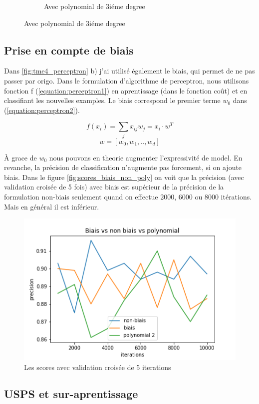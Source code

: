 \documentclass[a4paper,12pt]{article}
\begin{document}
\begin{figure}[h!]
\begin{subfigure}{.33\textwidth}
	\caption{Avec polynomial de 3iéme degree}
\end{subfigure}
\end{figure}

\subsection{Prise en compte de biais}

Dans \autoref{fig:tme4_perceptron} b) j'ai utilisé également le biais, qui permet de ne pas passer par origo. Dans le formulation
d'algorithme de perceptron, nous utilisons fonction f (\autoref{equation:perceptron1}) en aprentissage (dans le fonction coût) et
en classifiant les nouvelles examples. Le biais correspond le premier terme $w_{0}$ dans (\autoref{equation:perceptron2}).

\begin{equation}
\label{equation:perceptron1}
	f(x_{i}) = \sum_{j} x_{ij} w_{j} = x_{i}\cdot w^{T}
\end{equation}
\begin{equation}
\label{equation:perceptron2}
	w = [w_{0},w_{1},..,w_{d}]
\end{equation}

À grace de $w_{0}$ nous pouvons en theorie augmenter l'expressivité de model. En revanche, la précision de classification n'augmente pas forcement, si on ajoute biais.
Dans le figure \autoref{fig:scores_biais_non_poly} on voit que la précision (avec validation croisée de 5 fois)
avec biais est supérieur de la précision de la formulation non-biais seulement quand on effectue 2000, 6000 ou 8000 itérations.
Mais en général il est inférieur.

\begin{figure}[h!]
\caption{Les scores avec validation croisée de 5 iterations}
\label{fig:scores_biais_non_poly}
\includegraphics[width=0.5\linewidth]{images/tme4/scores_biais_non_poly.png}
\centering
\end{figure}%

\subsection{USPS et sur-aprentissage}
\end{document}
